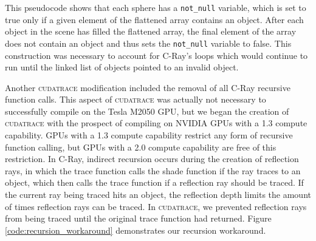 \documentclass[12pt]{article}
\begin{document}
This pseudocode shows that each sphere has a \texttt{not\_null} variable, which is set to true only if a given element of the flattened array contains an object. After each object in the scene has filled the flattened array, the final element of the array does not contain an object and thus sets the \texttt{not\_null} variable to false. This construction was necessary to account for C-Ray’s loops which would continue to run until the linked list of objects pointed to an invalid object.

Another \textsc{cudatrace} modification included the removal of all C-Ray recursive function calls. This aspect of \textsc{cudatrace} was actually not necessary to successfully compile on the Tesla M2050 GPU, but we began the creation of \textsc{cudatrace} with the prospect of compiling on NVIDIA GPUs with a 1.3 compute capability. GPUs with a 1.3 compute capability restrict any form of recursive function calling, but GPUs with a 2.0 compute capability are free of this restriction. In C-Ray, indirect recursion occurs during the creation of reflection rays, in which the trace function calls the shade function if the ray traces to an object, which then calls the trace function if a reflection ray should be traced. If the current ray being traced hits an object, the reflection depth limits the amount of times reflection rays can be traced. In \textsc{cudatrace}, we prevented reflection rays from being traced until the original trace function had returned. Figure \ref{code:recursion_workaround} demonstrates our recursion workaround.
\end{document}
